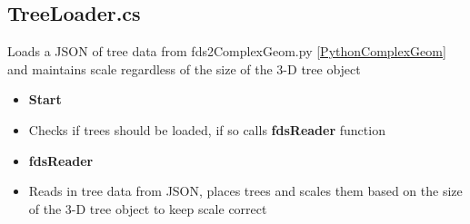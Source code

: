 \subsection{TreeLoader.cs}
Loads a JSON of tree data from  fds2ComplexGeom.py \ref{PythonComplexGeom} and maintains scale regardless of the size of the 3-D tree object        

\begin{itemize}
    \item \textbf{ Start}
    \item[] Checks if trees should be loaded, if so calls \textbf{fdsReader} function

    \item\textbf{fdsReader}
    \item[] Reads in tree data from JSON, places trees and scales them based on the size of the 3-D tree object to keep scale correct
\end{itemize}

